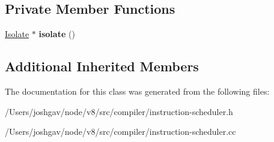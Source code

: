 \subsection*{Private Member Functions}
\begin{DoxyCompactItemize}
\item 
\hyperlink{classv8_1_1internal_1_1_isolate}{Isolate} $\ast$ {\bfseries isolate} ()\hypertarget{classv8_1_1internal_1_1compiler_1_1_instruction_scheduler_1_1_stress_scheduler_queue_ae40875c2ac3c108431ffc2c95eface48}{}\label{classv8_1_1internal_1_1compiler_1_1_instruction_scheduler_1_1_stress_scheduler_queue_ae40875c2ac3c108431ffc2c95eface48}

\end{DoxyCompactItemize}
\subsection*{Additional Inherited Members}


The documentation for this class was generated from the following files\+:\begin{DoxyCompactItemize}
\item 
/\+Users/joshgav/node/v8/src/compiler/instruction-\/scheduler.\+h\item 
/\+Users/joshgav/node/v8/src/compiler/instruction-\/scheduler.\+cc\end{DoxyCompactItemize}
